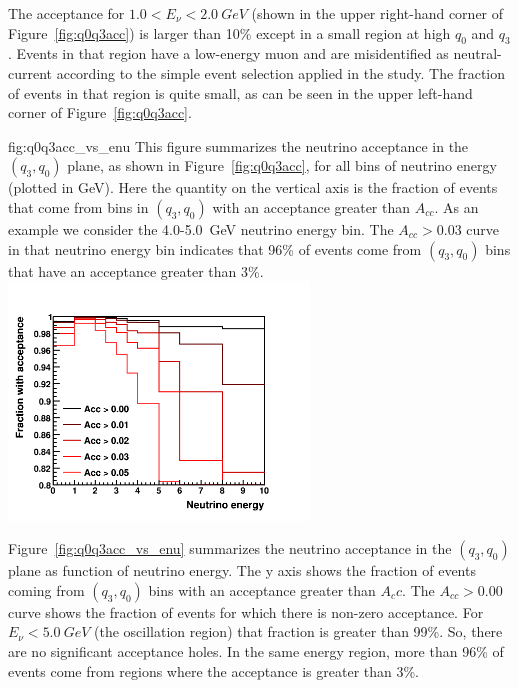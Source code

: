The acceptance for $\num{1.0} < E_\nu < \SI{2.0}{GeV}$ (shown in the upper right-hand corner of Figure~\ref{fig:q0q3acc}) is larger than 10\% except in a small region at high $q_0$ and $q_3$. Events in that region have a low-energy muon and are misidentified as neutral-current according to the simple event selection applied in the study. The fraction of events in that region is quite small, as can be seen in the upper left-hand corner of Figure~\ref{fig:q0q3acc}. 

\begin{dunefigure}{fig:q0q3acc_vs_enu}
{This figure summarizes the neutrino acceptance in the $(q_3,q_0)$ plane, as shown in Figure~\ref{fig:q0q3acc}, for all bins of neutrino energy (plotted in GeV). Here the quantity on the vertical axis is the fraction of events that come from bins in $(q_3,q_0)$ with an acceptance greater than $A_{cc}$. As an example we consider the \num{4.0}-\SI{5.0}{GeV} neutrino energy bin. The $A_{cc}>0.03$ curve in that neutrino energy bin indicates that 96\% of events come from $(q_3,q_0)$ bins that have an acceptance greater than 3\%. }
      \includegraphics[width=0.6\textwidth]{graphics/frac_with_acc.png}
\end{dunefigure}

Figure~\ref{fig:q0q3acc_vs_enu} summarizes the neutrino acceptance in the $(q_3,q_0)$ plane as function of neutrino energy. The y axis shows the fraction of events coming from $(q_3,q_0)$ bins with an acceptance greater than $A_cc$. The $A_{cc}>0.00$ curve shows the fraction of events for which there is non-zero acceptance. For $E_\nu < \SI{5.0}{GeV}$ (the oscillation region) that fraction is greater than 99\%. So, there are no significant acceptance holes.  In the same energy region, more than 96\% of events come from regions where the acceptance is greater than 3\%. %

